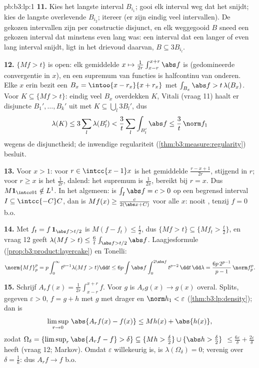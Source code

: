 \begin{solution}{pb:b3:lp:1}
\textbf{11.} Kies het langste interval $B_{i_1}$; gooi elk
interval weg dat het snijdt; kies de langste overlevende
$B_{i_2}$; itereer (er zijn eindig veel intervallen). De gekozen
intervallen zijn per constructie disjunct, en elk weggegooid $B$
sneed een gekozen interval dat minstens even lang was: een
interval dat een langer of even lang interval snijdt, ligt in het
drievoud daarvan, $B \subseteq 3B_{i_l}$.

\textbf{12.} $\{Mf > t\}$ is open: elk gemiddelde $x \mapsto
\frac1{2r}\int_{x-r}^{x+r}\abs f$ is  (gedomineerde
convergentie in $x$), en een supremum van  functies is
halfcontinu van onderen. Elke $x$ erin bezit een $B_x =
\intoo{x-r_x}{x+r_x}$ met $\int_{B_x}\abs f > t\,\lambda(B_x)$.
Voor  $K \subseteq \{Mf > t\}$: eindig veel $B_x$
overdekken $K$, Vitali (vraag 11) haalt er disjuncte $B_1',
\dots, B_k'$ uit met $K \subseteq \bigcup_l3B_l'$, dus
\[
\lambda(K) \leq 3\sum_l\lambda(B_l') <
\frac3t\sum_l\int_{B_l'}\abs f \leq \frac3t\,\norm f_1
\]
wegens de disjunctheid; de inwendige regulariteit
(\cref{thm:b3:measure:regularity}) besluit.

\textbf{13.} Voor $x > 1$: voor $r \in \intcc{x-1}x$ is het
gemiddelde $\frac{r - x + 1}{2r}$, stijgend in $r$; voor $r \geq
x$ is het $\frac1{2r}$, dalend: het supremum is $\frac1{2x}$,
bereikt bij $r = x$. Dus $M\mathbf 1_{\intcc01} \notin L^1$. In
het algemeen: is $\int_I\abs f = c > 0$ op een begrensd interval
$I \subseteq \intcc{-C}C$, dan is $Mf(x) \geq \frac{c}{2(\abs x +
C)}$ voor alle $x$: nooit , tenzij $f = 0$ b.o.

\textbf{14.} Met $f_t = f\,\mathbf 1_{\abs f > t/2}$ is $M(f -
f_t) \leq \frac t2$, dus $\{Mf > t\} \subseteq \{Mf_t > \frac
t2\}$, en vraag 12 geeft $\lambda(Mf > t) \leq \frac6t\int_{\abs
f > t/2}\abs f$. Laagjesformule
(\cref{prop:b3:product:layercake}) en Tonelli:
\[
\norm{Mf}_p^p = p\int_0^\infty t^{p-1}\lambda(Mf > t)\dd t
\leq 6p\int\abs f\int_0^{2\abs f}t^{p-2}\,\dd t\,\dd\lambda
= \frac{6p\,2^{p-1}}{p-1}\,\norm f_p^p .
\]

\textbf{15.} Schrijf $A_rf(x) = \frac1{2r}\int_{x-r}^{x+r}f$.
Voor  $g$ is $A_rg(x) \to g(x)$ overal. Splits, gegeven
$\varepsilon > 0$, $f = g + h$ met $g$  met 
drager en $\norm h_1 < \varepsilon$
(\cref{thm:b3:lp:density}); dan is
\[
\limsup_{r\to0}\,\abs{A_rf(x) - f(x)} \leq Mh(x) +
\abs{h(x)},
\]
zodat $\Omega_\delta = \{\limsup_r\abs{A_rf - f} > \delta\}
\subseteq \{Mh > \tfrac\delta2\} \cup \{\abs h > \tfrac\delta2\}$
 $\leq \frac{6\varepsilon}\delta + \frac{2\varepsilon}\delta$
heeft (vraag 12; Markov). Omdat $\varepsilon$ willekeurig is, is
$\lambda(\Omega_\delta) = 0$; verenig over $\delta = \frac1k$:
dus $A_rf \to f$ b.o.


\end{solution}
